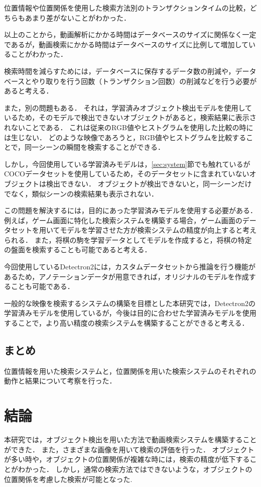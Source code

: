 \documentclass[a4j,12pt,dvipdfmx]{jreport}
\begin{document}
位置情報や位置関係を使用した検索方法別のトランザクションタイムの比較，どちらもあまり差がないことがわかった．

以上のことから，動画解析にかかる時間はデータベースのサイズに関係なく一定であるが，動画検索にかかる時間はデータベースのサイズに比例して増加していることがわかった．

検索時間を減らすためには，データベースに保存するデータ数の削減や，データベースとやり取りを行う回数（トランザクション回数）の削減などを行う必要があると考える．

また，別の問題もある．
それは，学習済みオブジェクト検出モデルを使用しているため，そのモデルで検出できないオブジェクトがあると，検索結果に表示されないことである．
これは従来のRGB値やヒストグラムを使用した比較の時には生じない．
どのような映像であろうと，RGB値やヒストグラムを比較することで，同一シーンの瞬間を検索することができる．

しかし，今回使用している学習済みモデルは，\ref{sec:system}節でも触れているがCOCOデータセットを使用しているため，そのデータセットに含まれていないオブジェクトは検出できない．
オブジェクトが検出できないと，同一シーンだけでなく，類似シーンの検索結果も表示されない．

この問題を解決するには，目的にあった学習済みモデルを使用する必要がある．
例えば，ゲーム画面に特化した検索システムを構築する場合，ゲーム画面のデータセットを用いてモデルを学習させた方が検索システムの精度が向上すると考えられる．
また，将棋の駒を学習データとしてモデルを作成すると，将棋の特定の盤面を検索することも可能であると考える．

今回使用しているDetectron2には，カスタムデータセットから推論を行う機能があるため，アノテーションデータが用意できれば，オリジナルのモデルを作成することも可能である．

一般的な映像を検索するシステムの構築を目標とした本研究では，Detectron2の学習済みモデルを使用しているが，今後は目的に合わせた学習済みモデルを使用することで，より高い精度の検索システムを構築することができると考える．

\section{まとめ}
位置情報を用いた検索システムと，位置関係を用いた検索システムのそれぞれの動作と結果について考察を行った．


\chapter{結論}
\label{sec:conclusion}
本研究では，オブジェクト検出を用いた方法で動画検索システムを構築することができた．
また，さまざまな画像を用いて検索の評価を行った．
オブジェクトが多い時や，オブジェクトの位置関係が複雑な時には，検索の精度が低下することがわかった．
しかし，通常の検索方法ではできないような，オブジェクトの位置関係を考慮した検索が可能となった.
\end{document}

